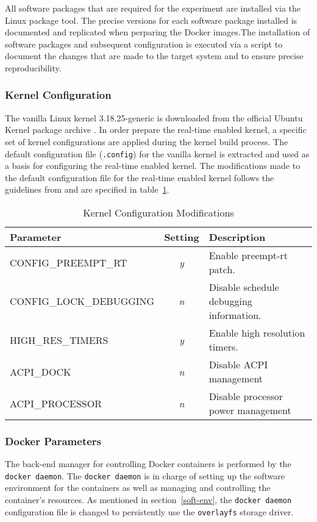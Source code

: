 All software packages that are required for the experiment are installed via the Linux package tool. The precise versions for each software package installed is documented and replicated when perparing the Docker images.The installation of software packages and subsequent configuration is executed via a script to document the changes that are made to the target system and to ensure precise reproducibility.

\subsubsection{Kernel Configuration} 
The vanilla Linux kernel 3.18.25-generic is downloaded from the official Ubuntu Kernel package archive \cite{kernel}. In order prepare the real-time enabled kernel, a specific set of kernel configurations are applied during the kernel build process. The default configuration file (\texttt{.config}) for the vanilla kernel is extracted and used as a basis for configuring the real-time enabled kernel. The modifications made to the default configuration file for the real-time enabled kernel follows the guidelines from \cite{rt-howto} and are specified in table~\ref{kernel-config}.  

\begin{table}[]
\begin{tabular}{|l|c|l|}
\hline
Parameter             		& \multicolumn{1}{l|}{Setting} & Description \\ \hline
CONFIG\_PREEMPT\_RT   		& \textit{y}                   & Enable preempt-rt patch.            \\ \hline
CONFIG\_LOCK\_DEBUGGING 	& \textit{n}                   & Disable schedule debugging information.            \\ \hline
HIGH\_RES\_TIMERS 			& \textit{y}				   & Enable high resolution timers. \\ \hline
ACPI\_DOCK					& \textit{n}				   & Disable ACPI management \\ \hline
ACPI\_PROCESSOR				& \textit{n}				   & Disable processor power management \\ \hline
\end{tabular}
\centering
\caption{Kernel Configuration Modifications}
\label{kernel-config}
\end{table}

\subsubsection{Docker Parameters}
The back-end manager for controlling Docker containers is performed by the \texttt{docker daemon}. The \texttt{docker daemon} is in charge of setting up the software environment for the containers as well as managing and controlling the container's resources. As mentioned in section~\ref{soft-env}, the \texttt{docker daemon} configuration file is changed to persistently use the \texttt{overlayfs} storage driver.\\

